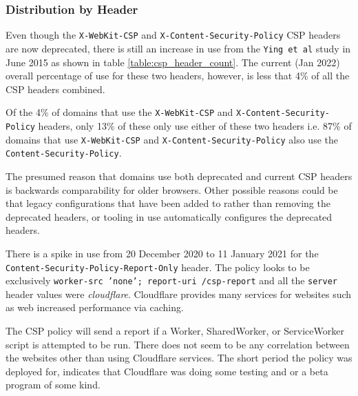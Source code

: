 \documentclass{mscreport}
\begin{document}
\subsubsection{Distribution by Header}
\label{subsubsec:csp_header_dist}

\vspace{0.3cm} \noindent
Even though the \texttt{X-WebKit-CSP} and \texttt{X-Content-Security-Policy} CSP headers are now deprecated, there is still an increase in use from the \texttt{Ying et al} study \cite{Ying2016-ag} in June 2015 as shown in table \ref{table:csp_header_count}. The current (Jan 2022) overall percentage of use for these two headers, however, is less that 4\% of all the CSP headers combined.

\vspace{0.3cm} \noindent
Of the 4\% of domains that use the \texttt{X-WebKit-CSP} and \texttt{X-Content-Security-Policy} headers, only 13\% of these only use either of these two headers i.e. 87\% of domains that use \texttt{X-WebKit-CSP} and \texttt{X-Content-Security-Policy} also use the \texttt{Content-Security-Policy}.

\vspace{0.3cm} \noindent
The presumed reason that domains use both deprecated and current CSP headers is backwards comparability for older browsers. Other possible reasons could be that legacy configurations that have been added to rather than removing the deprecated headers, or tooling in use automatically configures the deprecated headers.

\vspace{0.3cm} \noindent
There is a spike in use from 20 December 2020 to 11 January 2021 for the \newline \texttt{Content-Security-Policy-Report-Only} header. The policy looks to be exclusively \newline \texttt{worker-src 'none'; report-uri /csp-report} and all the \texttt{server} header values were \textit{cloudflare}. Cloudflare provides many services for websites such as web increased performance via caching.

\vspace{0.3cm} \noindent
The CSP policy will send a report if a Worker, SharedWorker, or ServiceWorker script is attempted to be run. There does not seem to be any correlation between the websites other than using Cloudflare services. The short period the policy was deployed for, indicates that Cloudflare was doing some testing and or a beta program of some kind.
\end{document}

